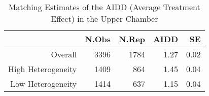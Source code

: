 \begin{table}[ht]
\centering
\begin{tabular}{rrrrr}
  \hline
 & N.Obs & N.Rep & AIDD & SE \\ 
  \hline
Overall & 3396 & 1784 & 1.27 & 0.02 \\ 
  High Heterogeneity & 1409 & 864 & 1.45 & 0.04 \\ 
  Low Heterogeneity & 1414 & 637 & 1.15 & 0.04 \\ 
   \hline
\end{tabular}
\caption{Matching Estimates of the AIDD (Average Treatment Effect) in the Upper Chamber} 
\label{matching.estss}
\end{table}
